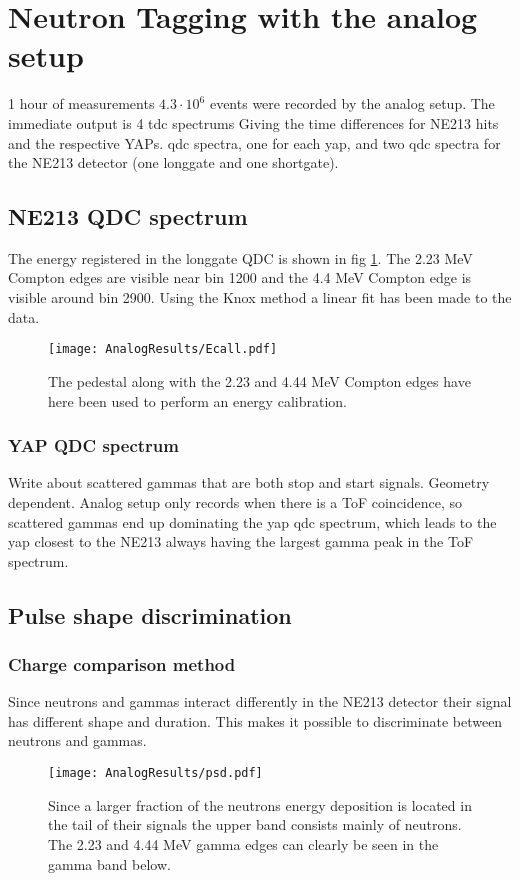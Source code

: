 \documentclass[main.tex]{subfiles}
\begin{document}
\section{Neutron Tagging with the analog setup}

1 hour of measurements $4.3\cdot 10^{6}$ events were recorded by the analog setup. The immediate output is 4 tdc spectrums Giving the time differences for NE213 hits and the respective YAPs. qdc spectra, one for each yap, and two qdc spectra for the NE213 detector (one longgate and one shortgate).
\subsection{NE213 QDC spectrum}
The energy registered in the longgate QDC is shown in fig \ref{fig:qdc_a}. The 2.23 MeV Compton edges are visible near bin 1200 and the 4.4 MeV Compton edge is visible around bin 2900. Using the Knox method a linear fit has been made to the data.
\begin{figure}[ht!]
    \centering
        \texttt{[image: AnalogResults/Ecall.pdf]}
        \caption{The pedestal along with the 2.23 and 4.44 MeV Compton edges have here been used to perform an energy calibration.}
    \label{fig:qdc_a}
\end{figure}

\newpage
\subsubsection{YAP QDC spectrum}
Write about scattered gammas that are both stop and start signals. Geometry dependent. Analog setup only records when there is a ToF coincidence, so scattered gammas end up dominating the yap qdc spectrum, which leads to the yap closest to the NE213 always having the largest gamma peak in the ToF spectrum. 

\newpage
\subsection{Pulse shape discrimination}
\subsubsection{Charge comparison method}
Since neutrons and gammas interact differently in the NE213 detector their signal has different shape and duration. This makes it possible to discriminate between neutrons and gammas.
\begin{figure}
    \centering
        \texttt{[image: AnalogResults/psd.pdf]}
        \caption{Since a larger fraction of the neutrons energy deposition is located in the tail of their signals the upper band consists mainly of neutrons. The 2.23 and 4.44 MeV gamma edges can clearly be seen in the gamma band below.}
        \label{fig:hex_a}
\end{figure}
\newpage
\end{document}
